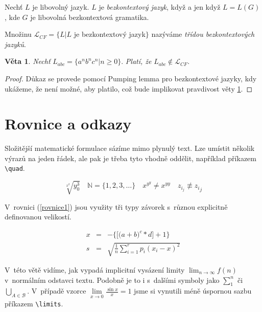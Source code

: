 \documentclass[11pt,a4paper,twocolumn]{article}
\begin{document}
\begin{definice} 
Nechť $L$ je libovolný jazyk. $L$ je \emph{bezkontextový jazyk}, když a jen když $L = L(G)$, kde $G$ je libovolná bezkontextová gramatika.
\end{definice}

\begin{definice}
Množinu $\mathcal{L}_{CF} = \{L | L$ je bezkontextový jazyk$\}$ nazýváme \emph{třídou bezkontextových jazyků}.
\end{definice}

\theoremstyle{definition}
\newtheorem{lemma}{Věta}

\begin{lemma}  \emph{Nechť} $L_{abc} = \{ a^n b^n c^n | n \geq 0 \}$. \emph{Platí, že} $L_{abc} \not\in \mathcal{L}_{CF}$. \label{veta} \end{lemma}

\begin{proof}  Důkaz se provede pomocí Pumping lemma pro bezkontextové jazyky, kdy ukážeme, že není možné, aby platilo, což bude implikovat pravdivost věty \ref{veta}.\end{proof}

\section{Rovnice a odkazy}

Složitější matematické formulace sázíme mimo plynulý text. Lze umístit několik výrazů na jeden řádek, ale pak je třeba tyto vhodně oddělit, například příkazem \verb|\quad|. 

$$\sqrt[x^2]{y^3_0} \quad \mathbb{N} = \{1,2,3,\ldots\} \quad x^{y^y} \neq x^{yy} \quad z_{i_j} \not\equiv {z_i}_j$$

V~rovnici (\ref{rovnice1}) jsou využity tři typy závorek s~různou explicitně definovanou velikostí.

\begin{eqnarray}
x & = & -\bigg\{\Big[\big(a + b\big)^c * d\Big] + 1\bigg\}\label{rovnice1} \\
s & = & \sqrt{\frac{1}{n}\sum\limits^r_{i=1} p_i (x_i - x)^2 \nonumber}
\end{eqnarray}

V~této větě vidíme, jak vypadá implicitní vysázení limity $\lim_{n \to \infty}f(n)$ v~normálním odstavci textu. Podobně je to i s~dalšími symboly jako $\sum_1^n$ či $\bigcup_{A\in \mathcal{B}}$. V~případě vzorce $\lim\limits_{x \to 0}\frac{\sin x}{x}=1$ jsme si vynutili méně úspornou sazbu příkazem \verb|\limits|.
\end{document}
